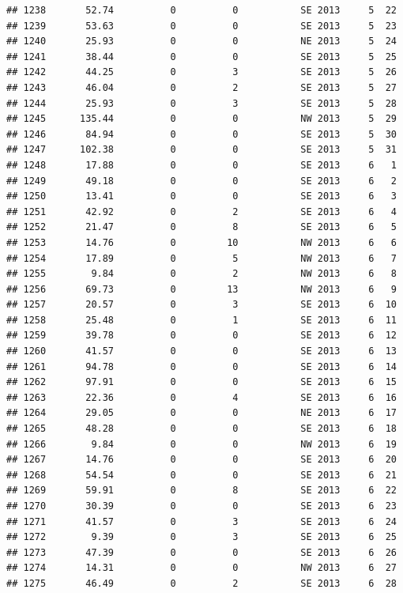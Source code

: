 \documentclass[
]{article}
\begin{document}
\begin{verbatim}
## 1238       52.74          0          0           SE 2013     5  22
## 1239       53.63          0          0           SE 2013     5  23
## 1240       25.93          0          0           NE 2013     5  24
## 1241       38.44          0          0           SE 2013     5  25
## 1242       44.25          0          3           SE 2013     5  26
## 1243       46.04          0          2           SE 2013     5  27
## 1244       25.93          0          3           SE 2013     5  28
## 1245      135.44          0          0           NW 2013     5  29
## 1246       84.94          0          0           SE 2013     5  30
## 1247      102.38          0          0           SE 2013     5  31
## 1248       17.88          0          0           SE 2013     6   1
## 1249       49.18          0          0           SE 2013     6   2
## 1250       13.41          0          0           SE 2013     6   3
## 1251       42.92          0          2           SE 2013     6   4
## 1252       21.47          0          8           SE 2013     6   5
## 1253       14.76          0         10           NW 2013     6   6
## 1254       17.89          0          5           NW 2013     6   7
## 1255        9.84          0          2           NW 2013     6   8
## 1256       69.73          0         13           NW 2013     6   9
## 1257       20.57          0          3           SE 2013     6  10
## 1258       25.48          0          1           SE 2013     6  11
## 1259       39.78          0          0           SE 2013     6  12
## 1260       41.57          0          0           SE 2013     6  13
## 1261       94.78          0          0           SE 2013     6  14
## 1262       97.91          0          0           SE 2013     6  15
## 1263       22.36          0          4           SE 2013     6  16
## 1264       29.05          0          0           NE 2013     6  17
## 1265       48.28          0          0           SE 2013     6  18
## 1266        9.84          0          0           NW 2013     6  19
## 1267       14.76          0          0           SE 2013     6  20
## 1268       54.54          0          0           SE 2013     6  21
## 1269       59.91          0          8           SE 2013     6  22
## 1270       30.39          0          0           SE 2013     6  23
## 1271       41.57          0          3           SE 2013     6  24
## 1272        9.39          0          3           SE 2013     6  25
## 1273       47.39          0          0           SE 2013     6  26
## 1274       14.31          0          0           NW 2013     6  27
## 1275       46.49          0          2           SE 2013     6  28

\end{verbatim}
\end{document}
